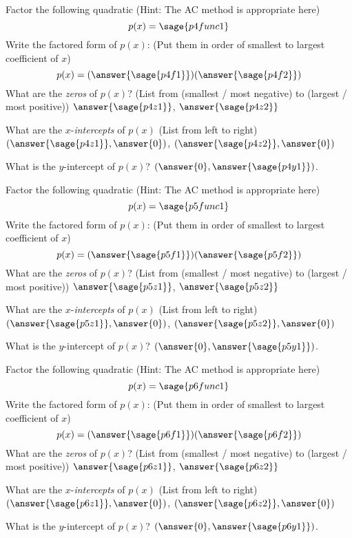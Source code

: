 \documentclass{ximera}
\begin{document}
\begin{problem}%
    Factor the following quadratic (Hint: The AC method is appropriate here)
    \[
        p(x) = \sage{p4func1}
    \]
    Write the factored form of $p(x)$: (Put them in order of smallest to largest coefficient of $x$)
    \[
        p(x) = (\answer{\sage{p4f1}})(\answer{\sage{p4f2}})
    \]
    What are the \textit{zeros} of $p(x)$? (List from (smallest / most negative) to (largest / most positive)) $\answer{\sage{p4z1}}$, $\answer{\sage{p4z2}}$
    
    What are the $x$-\textit{intercepts} of $p(x)$ (List from left to right)
    $(\answer{\sage{p4z1}},\answer{0})$, $(\answer{\sage{p4z2}},\answer{0})$
    
    What is the $y$-intercept of $p(x)$?
    $(\answer{0},\answer{\sage{p4y1}})$.    
\end{problem}


\begin{problem}%
    Factor the following quadratic (Hint: The AC method is appropriate here)
    \[
        p(x) = \sage{p5func1}
    \]
    Write the factored form of $p(x)$: (Put them in order of smallest to largest coefficient of $x$)
    \[
        p(x) = (\answer{\sage{p5f1}})(\answer{\sage{p5f2}})
    \]
    What are the \textit{zeros} of $p(x)$? (List from (smallest / most negative) to (largest / most positive)) $\answer{\sage{p5z1}}$, $\answer{\sage{p5z2}}$
    
    What are the $x$-\textit{intercepts} of $p(x)$ (List from left to right)
    $(\answer{\sage{p5z1}},\answer{0})$, $(\answer{\sage{p5z2}},\answer{0})$
    
    What is the $y$-intercept of $p(x)$?
    $(\answer{0},\answer{\sage{p5y1}})$.    
\end{problem}

\begin{problem}%
    Factor the following quadratic (Hint: The AC method is appropriate here)
    \[
        p(x) = \sage{p6func1}
    \]
    Write the factored form of $p(x)$: (Put them in order of smallest to largest coefficient of $x$)
    \[
        p(x) = (\answer{\sage{p6f1}})(\answer{\sage{p6f2}})
    \]
    What are the \textit{zeros} of $p(x)$? (List from (smallest / most negative) to (largest / most positive)) $\answer{\sage{p6z1}}$, $\answer{\sage{p6z2}}$
    
    What are the $x$-\textit{intercepts} of $p(x)$ (List from left to right)
    $(\answer{\sage{p6z1}},\answer{0})$, $(\answer{\sage{p6z2}},\answer{0})$
    
    What is the $y$-intercept of $p(x)$?
    $(\answer{0},\answer{\sage{p6y1}})$.    
\end{problem}
\end{document}

